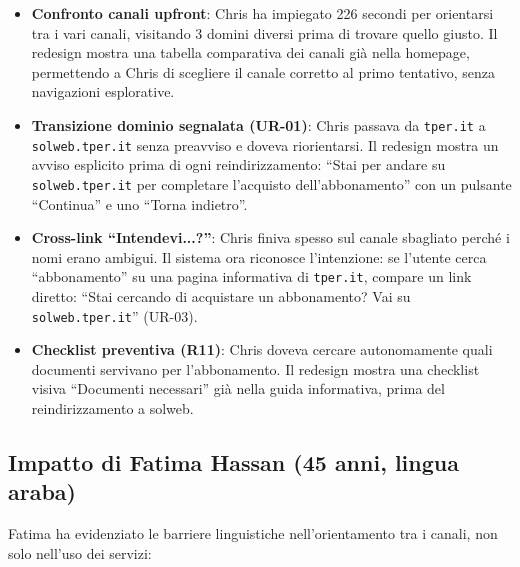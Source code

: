 \begin{itemize}
    \item \textbf{Confronto canali upfront}: Chris ha impiegato 226 secondi per orientarsi tra i vari canali, visitando 3 domini diversi prima di trovare quello giusto. Il redesign mostra una tabella comparativa dei canali gi\`a nella homepage, permettendo a Chris di scegliere il canale corretto al primo tentativo, senza navigazioni esplorative.
    \item \textbf{Transizione dominio segnalata (UR-01)}: Chris passava da \texttt{tper.it} a \texttt{solweb.tper.it} senza preavviso e doveva riorientarsi. Il redesign mostra un avviso esplicito prima di ogni reindirizzamento: ``Stai per andare su \texttt{solweb.tper.it} per completare l'acquisto dell'abbonamento'' con un pulsante ``Continua'' e uno ``Torna indietro''.
    \item \textbf{Cross-link ``Intendevi...?''}: Chris finiva spesso sul canale sbagliato perch\'e i nomi erano ambigui. Il sistema ora riconosce l'intenzione: se l'utente cerca ``abbonamento'' su una pagina informativa di \texttt{tper.it}, compare un link diretto: ``Stai cercando di acquistare un abbonamento? Vai su \texttt{solweb.tper.it}'' (UR-03).
    \item \textbf{Checklist preventiva (R11)}: Chris doveva cercare autonomamente quali documenti servivano per l'abbonamento. Il redesign mostra una checklist visiva ``Documenti necessari'' gi\`a nella guida informativa, prima del reindirizzamento a solweb.
\end{itemize}

\subsection{Impatto di Fatima Hassan (45 anni, lingua araba)}

Fatima ha evidenziato le barriere linguistiche nell'orientamento tra i canali, non solo nell'uso dei servizi:


